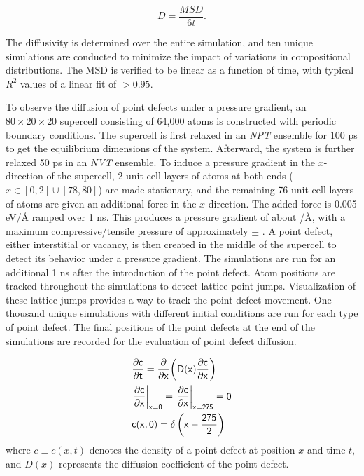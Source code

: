 \documentclass[review]{elsarticle}
\providecommand{\DIFadd}[1]{{\sf #1}} %
\providecommand{\DIFdel}[1]{{[..\footnote{removed: #1} ]}} %
\providecommand{\DIFaddbegin}{\protect\color{blue}} %
\providecommand{\DIFaddend}{\protect\color{black}} %
\providecommand{\DIFdelbegin}{\protect\color{red}} %
\providecommand{\DIFdelend}{\protect\color{black}} %
\newcommand{\DIFscaledelfig}{0.5}
\newlength{\DIFdelgraphicswidth} %
\newlength{\DIFdelgraphicsheight} %
\newcommand{\DIFaddincludegraphics}[2][]{{\color{blue}\fbox{\DIFOincludegraphics[#1]{#2}}}} %
\newcommand{\DIFdelincludegraphics}[2][]{%
\sbox{\DIFdelgraphicsbox}{\DIFOincludegraphics[#1]{#2}}%
\settoboxwidth{\DIFdelgraphicswidth}{\DIFdelgraphicsbox} %
\settoboxtotalheight{\DIFdelgraphicsheight}{\DIFdelgraphicsbox} %
\scalebox{\DIFscaledelfig}{%
\parbox[b]{\DIFdelgraphicswidth}{\usebox{\DIFdelgraphicsbox}\\[-\baselineskip] \rule{\DIFdelgraphicswidth}{0em}}\llap{\resizebox{\DIFdelgraphicswidth}{\DIFdelgraphicsheight}{%
\setlength{\unitlength}{\DIFdelgraphicswidth}%
\begin{picture}(1,1)%
\thicklines\linethickness{2pt} %
{\color[rgb]{1,0,0}\put(0,0){\framebox(1,1){}}}%
{\color[rgb]{1,0,0}\put(0,0){\line( 1,1){1}}}%
{\color[rgb]{1,0,0}\put(0,1){\line(1,-1){1}}}%
\end{picture}%
}\hspace*{3pt}}} %
} %
\DeclareRobustCommand{\DIFaddbegin}{\DIFOaddbegin \let\includegraphics\DIFaddincludegraphics} %
\DeclareRobustCommand{\DIFaddend}{\DIFOaddend \let\includegraphics\DIFOincludegraphics} %
\DeclareRobustCommand{\DIFdelbegin}{\DIFOdelbegin \let\includegraphics\DIFdelincludegraphics} %
\DeclareRobustCommand{\DIFdelend}{\DIFOaddend \let\includegraphics\DIFOincludegraphics} %
\begin{document}
\begin{equation}
    D = \frac{MSD}{6t}.
\end{equation}

\noindent The diffusivity is determined over the entire simulation, and ten unique simulations are conducted to minimize the impact of variations in compositional distributions. The MSD is verified to be linear as a function of time, with typical $R^2$ values of a linear fit of $> 0.95$.

To observe the diffusion of point defects under a pressure gradient, an $80 \times 20 \times 20$ supercell consisting of 64,000 atoms is constructed with periodic boundary conditions. The supercell is first relaxed in an \textit{NPT} ensemble for 100 ps to get the equilibrium dimensions of the system. Afterward, the system is further relaxed 50 ps in an \textit{NVT} ensemble. \DIFaddbegin \DIFadd{The temperature was held constant at 1200 K throughout the simulation. }\DIFaddend To induce a pressure gradient in the $x$-direction of the supercell, 2 unit cell layers of atoms at both ends ($x \in [0, 2] \cup [78, 80]$) are made stationary, and the remaining 76 unit cell layers of atoms are given an additional force in the $x$-direction. The added force is 0.005 eV/\r{A} ramped over 1 ns. This produces a pressure gradient of about \DIFdelbegin \DIFdel{0.03 GPa}\DIFdelend \DIFaddbegin \DIFadd{0.3 kbar}\DIFaddend /\r{A}, with a maximum compressive/tensile pressure of approximately $\pm$ \DIFdelbegin \DIFdel{5 GPA}\DIFdelend \DIFaddbegin \DIFadd{50 kbar}\DIFaddend . A point defect, either interstitial or vacancy, is then created in the middle of the supercell to detect its behavior under a pressure gradient. The simulations are run for an additional 1 ns after the introduction of the point defect. Atom positions are tracked throughout the simulations to detect lattice point jumps. Visualization of these lattice jumps provides a way to track the point defect movement. One thousand unique simulations with different initial conditions are run for each type of point defect. The final positions of the point defects at the end of the simulations are recorded for the evaluation of point defect diffusion.

\DIFaddbegin \DIFadd{To evaluate the density of defects analytically, the 1D diffusion equation was solved using the implicit Euler method. The zero flux boundary conditions were applied along with a discrete approximation of a Dirac delta function as the initial condition. The following equations describe the system:
}\begin{align} \DIFadd{\label{eq:1D_diff}
    }&\DIFadd{\frac{\partial c}{\partial t}
    = \frac{\partial}{\partial x} \bigg(
        D(x) \frac{\partial c}{\partial x}
    \bigg) }\\
    &\DIFadd{\left. \frac{\partial c}{\partial x} \right|_{x=0}
    = \left. \frac{\partial c}{\partial x} \right|_{x=275}
    = 0 }\\
    &\DIFadd{c(x, 0) = \delta\left(x-\frac{275}{2}\right)
}\end{align}
\DIFadd{where $c \equiv c(x, t)$ denotes the density of a point defect at position $x$ and time $t$, and $D(x)$ represents the diffusion coefficient of the point defect. 
}
\end{document}
